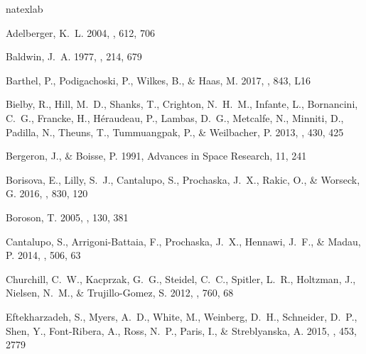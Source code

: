 \documentclass[iop]{emulateapj}
\begin{document}
\begin{thebibliography}{61}
\expandafter\ifx\csname natexlab\endcsname\relax\def\natexlab#1{#1}\fi

{Adelberger}, K.~L. 2004, \apj, 612, 706

{Baldwin}, J.~A. 1977, \apj, 214, 679

{Barthel}, P., {Podigachoski}, P., {Wilkes}, B., \& {Haas}, M. 2017, \apjl,
  843, L16

{Bielby}, R., {Hill}, M.~D., {Shanks}, T., {Crighton}, N.~H.~M., {Infante}, L.,
  {Bornancini}, C.~G., {Francke}, H., {H{\'e}raudeau}, P., {Lambas}, D.~G.,
  {Metcalfe}, N., {Minniti}, D., {Padilla}, N., {Theuns}, T., {Tummuangpak},
  P., \& {Weilbacher}, P. 2013, \mnras, 430, 425

{Bergeron}, J., \& {Boisse}, P. 1991, Advances in Space Research, 11, 241

{Borisova}, E., {Lilly}, S.~J., {Cantalupo}, S., {Prochaska}, J.~X., {Rakic},
  O., \& {Worseck}, G. 2016, \apj, 830, 120

{Boroson}, T. 2005, \aj, 130, 381

{Cantalupo}, S., {Arrigoni-Battaia}, F., {Prochaska}, J.~X., {Hennawi}, J.~F.,
  \& {Madau}, P. 2014, \nat, 506, 63

{Churchill}, C.~W., {Kacprzak}, G.~G., {Steidel}, C.~C., {Spitler}, L.~R.,
  {Holtzman}, J., {Nielsen}, N.~M., \& {Trujillo-Gomez}, S. 2012, \apj, 760, 68

{Eftekharzadeh}, S., {Myers}, A.~D., {White}, M., {Weinberg}, D.~H.,
  {Schneider}, D.~P., {Shen}, Y., {Font-Ribera}, A., {Ross}, N.~P., {Paris},
  I., \& {Streblyanska}, A. 2015, \mnras, 453, 2779


\end{thebibliography}
\end{document}
